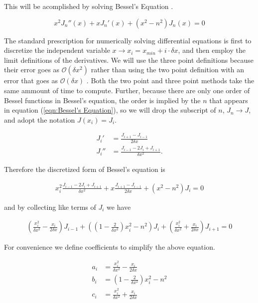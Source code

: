 \documentclass[onecolumn, groupedaddress, 10pt]{revtex4-1}
\begin{document}
This will be acomplished by solving Bessel's Equation \citep{folland}.

\begin{equation}
\label{eqn:Bessel's Equation}
x^2 J_n''(x) + x J_n'(x) + (x^2 - n^2) J_n(x) = 0
\end{equation}

The standard prescription for numerically solving differential equations is first to discretize the independent variable $x \to x_i = x_{min} + i \cdot \delta x$, and then employ the limit definitions of the derivatives. We will use the three point definitions because their error goes as $\mathcal{O}(\delta x^2)$ rather than using the two point definition with an error that goes as $\mathcal{O}(\delta x)$ \cite{morten}.  Both the two point and three point methods take the same ammount of time to compute.  Further, because there are only one order of Bessel functions in Bessel's equation, the order is implied by the $n$ that appears in equation (\ref{eqn:Bessel's Equation}), so we will drop the subscript of $n$, $J_n \to J$, and adopt the notation $J(x_i) = J_i$.

\begin{align}
J_i'  &= \frac{J_{i+1} - J_{i-1}}{2 \delta x} \\
J_i'' &= \frac{J_{i-1} - 2J_{i} + J_{i+1}}{\delta x^2}.
\end{align}

Therefore the discretized form of Bessel's equation is

\begin{align}
\label{eqn:Bessel's Equation Discretized}
x_i^2 \frac{J_{i-1} - 2J_{i} + J_{i+1}}{\delta x^2} + x \frac{J_{i+1} - J_{i-1}}{2 \delta x} + (x^2 - n^2) J_i = 0
\end{align}

and by collecting like terms of $J_i$ we have

\begin{align}
\left(\frac{x_i^2}{\delta x^2} - \frac{x_i}{2\delta x}\right) J_{i-1}
	+ \left( \left(1-\frac{2}{\delta x^2}\right)x_i^2 - n^2 \right) J_i
	+ \left(\frac{x_i^2}{\delta x^2} + \frac{x_i}{2\delta x}\right) J_{i+1}
	= 0
\end{align}

For convenience we define coefficients to simplify the above equation.

\begin{align}
a_i &= \frac{x_i^2}{\delta x^2} - \frac{x_i}{2\delta x} 	\\
b_i &= \left(1-\frac{2}{\delta x^2}\right)x_i^2 - n^2  	\\
c_i &= \frac{x_i^2}{\delta x^2} + \frac{x_i}{2\delta x}
\end{align}
\end{document}

